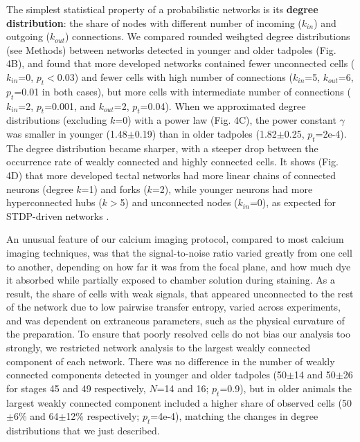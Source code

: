 \documentclass{article}
\begin{document}
The simplest statistical property of a probabilistic networks is its \textbf{degree distribution}: the share of nodes with different number of incoming ($k_{in}$) and outgoing ($k_{out}$) connections. We compared rounded weihgted degree distributions (see Methods) between networks detected in younger and older tadpoles (Fig. 4B), and found that more developed networks contained fewer unconnected cells ($k_{in}$=0, $p_t<$0.03) and fewer cells with high number of connections ($k_{in}$=5, $k_{out}$=6, $p_t$=0.01 in both cases), but more cells with intermediate number of connections ($k_{in}$=2, $p_t$=0.001, and $k_{out}$=2, $p_t$=0.04). When we approximated degree distributions (excluding $k$=0) with a power law (Fig. 4C), the power constant $\gamma$ was smaller in younger (1.48$\pm$0.19) than in older tadpoles (1.82$\pm$0.25, $p_t$=2e-4). The degree distribution became sharper, with a steeper drop between the occurrence rate of weakly connected and highly connected cells. It shows (Fig. 4D) that more developed tectal networks had more linear chains of connected neurons (degree $k$=1) and forks ($k$=2), while younger neurons had more hyperconnected hubs ($k>$5) and unconnected nodes ($k_{in}$=0), as expected for STDP-driven networks \citep{fiete2010chains}.

An unusual feature of our calcium imaging protocol, compared to most calcium imaging techniques, was that the signal-to-noise ratio varied greatly from one cell to another, depending on how far it was from the focal plane, and how much dye it absorbed while partially exposed to chamber solution during staining. As a result, the share of cells with weak signals, that appeared unconnected to the rest of the network due to low pairwise transfer entropy, varied across experiments, and was dependent on extraneous parameters, such as the physical curvature of the preparation. To ensure that poorly resolved cells do not bias our analysis too strongly, we restricted network analysis to the largest weakly connected component of each network. There was no difference in the number of weakly connected components detected in younger and older tadpoles (50$\pm$14 and 50$\pm$26 for stages 45 and 49 respectively, $N$=14 and 16; $p_t$=0.9), but in older animals the largest weakly connected component included a higher share of observed cells (50$\pm$6\% and 64$\pm$12\% respectively; $p_t$=4e-4), matching the changes in degree distributions that we just described.
\end{document}
